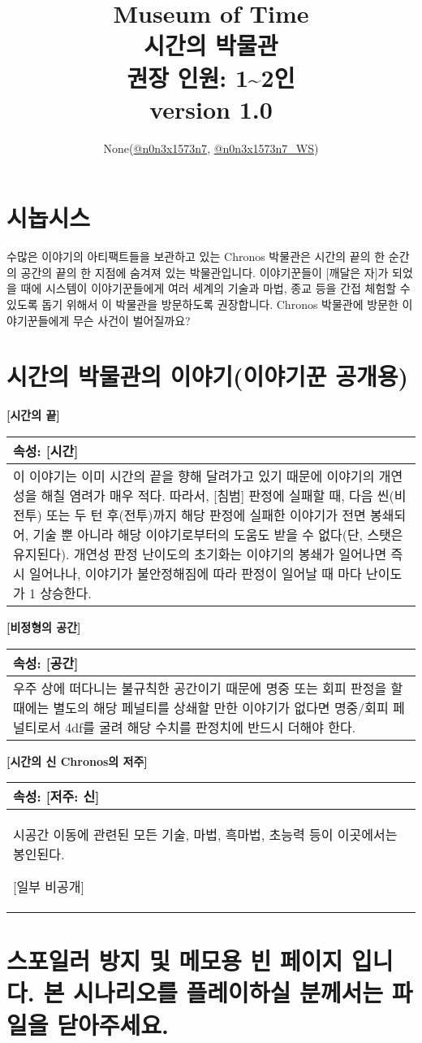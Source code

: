 \documentclass[12pt]{report}
\title{
	Museum of Time\\
	시간의 박물관\\
	\large
	권장 인원: 1\textasciitilde2인\\
	version 1.0
}
\author{None(\href{https://www.twitter.com/n0n3x1573n7}{@n0n3x1573n7}, \href{https://www.twitter.com/n0n3x1573n7_WS}{@n0n3x1573n7\_WS})}
\date{}
\newenvironment{story}[2]
{\begin{center}
		{\large \textbf{[#1]}}\\[1ex]
		\begin{tabular}{|p{\textwidth}|}
			\hline
			\textbf{속성}: #2
			\\
			\hline
		}
		{
			\\\hline
		\end{tabular}
	\end{center}
}
\begin{document}
	\maketitle
	
	\chapter{시놉시스}
	수많은 이야기의 아티팩트들을 보관하고 있는 Chronos 박물관은 시간의 끝의 한 순간의 공간의 끝의 한 지점에 숨겨져 있는 박물관입니다. 이야기꾼들이 [깨달은 자]가 되었을 때에 시스템이 이야기꾼들에게 여러 세계의 기술과 마법, 종교 등을 간접 체험할 수 있도록 돕기 위해서 이 박물관을 방문하도록 권장합니다. Chronos 박물관에 방문한 이야기꾼들에게 무슨 사건이 벌어질까요?
	
	\chapter{시간의 박물관의 이야기(이야기꾼 공개용)}
	
		\begin{story}{시간의 끝}{[시간]}
			이 이야기는 이미 시간의 끝을 향해 달려가고 있기 때문에 이야기의 개연성을 해칠 염려가 매우 적다. 따라서, [침범] 판정에 실패할 때, 다음 씬(비전투) 또는 두 턴 후(전투)까지 해당 판정에 실패한 이야기가 전면 봉쇄되어, 기술 뿐 아니라 해당 이야기로부터의 도움도 받을 수 없다(단, 스탯은 유지된다). 개연성 판정 난이도의 초기화는 이야기의 봉쇄가 일어나면 즉시 일어나나, 이야기가 불안정해짐에 따라 판정이 일어날 때 마다 난이도가 1 상승한다.
		\end{story}
		
		\begin{story}{비정형의 공간}{[공간]}
			우주 상에 떠다니는 불규칙한 공간이기 때문에 명중 또는 회피 판정을 할 때에는 별도의 해당 페널티를 상쇄할 만한 이야기가 없다면 명중/회피 페널티로서 4df를 굴려 해당 수치를 판정치에 반드시 더해야 한다.
		\end{story}
		
		\begin{story}{시간의 신 Chronos의 저주}{[저주: 신]}
			시공간 이동에 관련된 모든 기술, 마법, 흑마법, 초능력 등이 이곳에서는 봉인된다.
			
			[일부 비공개]
		\end{story}
	
	\chapter*{스포일러 방지 및 메모용 빈 페이지 입니다. 본 시나리오를 플레이하실 분께서는 파일을 닫아주세요.}
	
\end{document}
